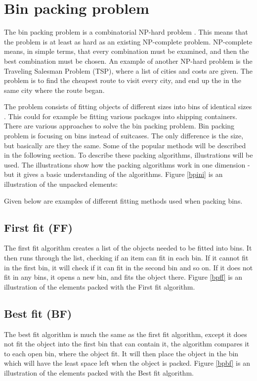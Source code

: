 \section{Bin packing problem}
\label{sec:binpacking}
The bin packing problem is a combinatorial NP-hard problem \citep{combopt}. This means that the problem is at least as hard as an existing NP-complete problem. NP-complete means, in simple terms, that every combination must be examined, and then the best combination must be chosen. An example of another NP-hard problem is the Traveling Salesman Problem (TSP), where a list of cities and costs are given. The problem is to find the cheapest route to visit every city, and end up the in the same city where the route began.  \citep{binpackingsource}

The problem consists of fitting objects of different sizes into bins of identical sizes \citep{appofdismath}. This could for example be fitting various packages into shipping containers. There are various approaches to solve the bin packing problem. Bin packing problem is focusing on bins instead of suitcases. The only difference is the size, but basically are they the same. Some of the popular methods will be described in the following section. To describe these packing algorithms, illustrations will be used. The illustrations show how the packing algorithms work in one dimension - but it gives a basic understanding of the algorithms. Figure \ref{bpini} is an illustration of the unpacked elements:

Given below are examples of different fitting methods used when packing bins.

\subsection{First fit (FF)}
The first fit algorithm creates a list of the objects needed to be fitted into bins. It then runs through the list, checking if an item can fit in each bin. If it cannot fit in the first bin, it will check if it can fit in the second bin and so on. If it does not fit in any bins, it opens a new bin, and fits the object there. Figure \ref{bpff} is an illustration of the elements packed with the First fit algorithm.

\subsection{Best fit (BF)}
The best fit algorithm is much the same as the first fit algorithm, except it does not fit the object into the first bin that can contain it, the algorithm compares it to each open bin, where the object fit. It will then place the object in the bin which will have the least space left when the object is packed. Figure \ref{bpbf} is an illustration of the elements packed with the Best fit algorithm.

